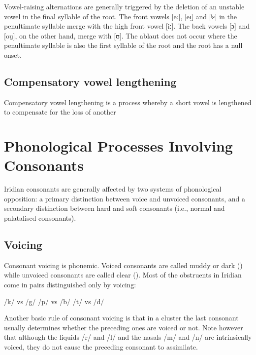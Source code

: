 Vowel-raising alternations are generally triggered by the deletion of an
unstable vowel in the final syllable of the root. The front vowels [eː], [eɪ̯]
and [ʲɛ] in the penultimate syllable merge with the high front vowel [iː]. The
back vowels [ɔ] and [ou̯], on the other hand, merge with [ʊ]. The ablaut does
not occur where the penultimate syllable is also the first syllable of the root
and the root has a null onset.

\ex
{}
\xe


\subsection{Compensatory vowel lengthening}

Compensatory vowel lengthening is a process whereby a short vowel is lengthened
to compensate for the loss of another 

\section{Phonological Processes Involving Consonants}

Iridian consonants are generally affected by two systems of phonological
opposition: a primary distinction between voice and unvoiced consonants, and a
secondary distinction between hard and soft consonants (i.e., normal and
palatalised consonants).

\subsection{Voicing}
Consonant voicing is phonemic. Voiced consonants are called muddy or dark
() while unvoiced consonants are called clear ().
Most of the obstruents in Iridian come in pairs distinguished only by voicing:

\pex
\a /k/  vs /g/ 
\a /p/  vs /b/ 
\a /t/  vs /d/ 
\xe

Another basic rule of consonant voicing is that in a cluster the last consonant
usually determines whether the preceding ones are voiced or not. Note however that although the liquids /r/ and /l/ and the nasals
/m/ and /n/ are intrinsically voiced, they do not cause the preceding consonant
to assimilate.

